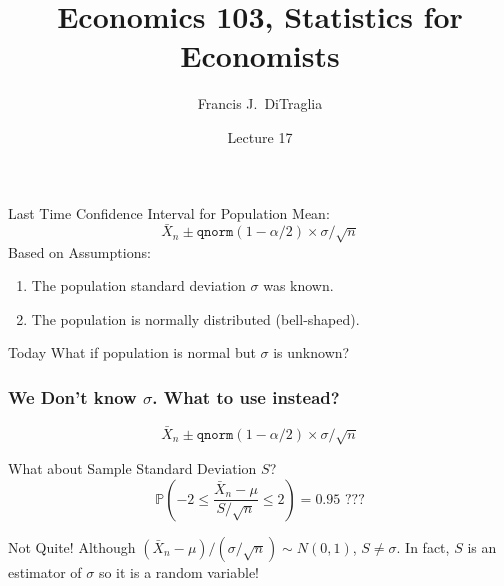 \documentclass[handout]{beamer}
\title[Econ 103]{Economics 103, Statistics for Economists}
\author[F. DiTraglia]{Francis J.\ DiTraglia}
\institute{University of Pennsylvania}
\date{Lecture 17}
\newcommand{\p}{\mathbb{P}}
\begin{document}
 





\begin{frame}[plain]
	\titlepage 
	

\end{frame} 





\begin{frame}
\begin{block}{Last Time}
Confidence Interval for Population Mean:
$$\boxed{\bar{X}_n \pm \texttt{qnorm}(1-\alpha/2) \times \sigma/\sqrt{n}}$$
Based on Assumptions:
	\begin{enumerate}
\item The population standard deviation $\sigma$ was known.
\item The population is normally distributed (bell-shaped).
\end{enumerate}
\end{block}
\begin{block}{Today}
What if population is normal but $\sigma$ is unknown?
\end{block}

\end{frame}
\begin{frame}
\frametitle{We Don't know $\sigma$. What to use instead?}
$$\boxed{\bar{X}_n \pm \texttt{qnorm}(1-\alpha/2) \times \sigma/\sqrt{n}}$$

\begin{block}{What about Sample Standard Deviation $S$?}
	$$\p\left(-2 \leq \frac{\bar{X}_n-\mu}{S/\sqrt{n}} \leq 2 \right) = 0.95 \mbox{ ???}$$
\end{block}

\begin{block}{Not Quite!}
Although $(\bar{X}_n-\mu)/(\sigma/\sqrt{n})\sim N(0,1)$, $S \neq \sigma$. In fact, $S$ is an \alert{estimator} of $\sigma$ so it is a \alert{random variable!}
\end{block}
\end{frame}
\end{document}
